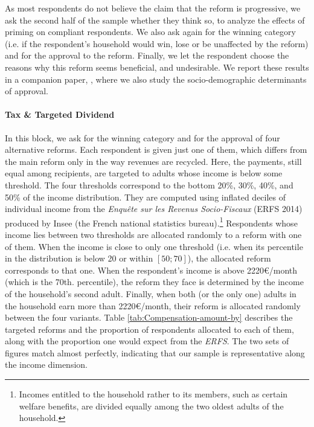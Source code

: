 \documentclass[11pt]{article}
\begin{document}
As most respondents do not believe the claim that the reform is progressive, we ask the second half of the sample whether they think so, to analyze the effects of priming on compliant respondents. We also ask again for the winning category (i.e. if the respondent's household would win, lose or be unaffected by the reform) and for the approval to the reform. Finally, we let the respondent choose the reasons why this reform seems beneficial, and undesirable. We report these results in a companion paper, \citet{douenne_french_2019}, where we also study the socio-demographic determinants of approval.

\paragraph{Tax \& Targeted Dividend}
In this block, we ask for the winning category and for the approval of four alternative reforms. Each respondent is given just one of them, which differs from the main reform only in the way revenues are recycled. Here, the payments, still equal among recipients, are targeted to adults whose income is below some threshold. The four thresholds correspond to the bottom 20\%, 30\%, 40\%, and 50\% of the income distribution. They are computed using inflated deciles of individual income from the \emph{Enquête sur les Revenus Socio-Fiscaux }(ERFS 2014) produced by Insee (the French national statistics bureau).\footnote{Incomes entitled to the household rather to its members, such as certain welfare benefits, are divided equally among the two oldest adults of the household.} Respondents whose income lies between two thresholds are allocated randomly to a reform with one of them. When the income is close to only one threshold (i.e. when its percentile in the distribution is below 20 or within $\left[50;70\right]$), the allocated reform corresponds to that one. When the respondent's income is above 2220\euro{}/month (which is the 70th. percentile), the reform they face is determined by the income of the household's second adult. Finally, when both (or the only one) adults in the household earn more than 2220\euro{}/month, their reform is allocated randomly between the four variants. Table \ref{tab:Compensation-amount-by} describes the targeted reforms and the proportion of respondents allocated to each of them, along with the proportion one would expect from the \emph{ERFS}. The two sets of figures match almost perfectly, indicating that our sample is representative along the income dimension.
\end{document}
